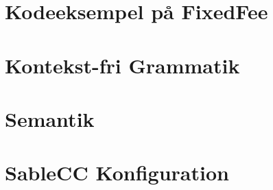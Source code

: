 \appendix

\chapter{Kodeeksempel på FixedFee}
\label{bil:fixedfee}


\label{FIRSTAPPENDIX} %

\chapter{Kontekst-fri Grammatik}
\label{bil:cfg}


\chapter{Semantik}
\label{bil:semantik}


\chapter{SableCC Konfiguration}
\label{bil:sablecc}


%


%

%

\label{LASTAPPENDIX}
